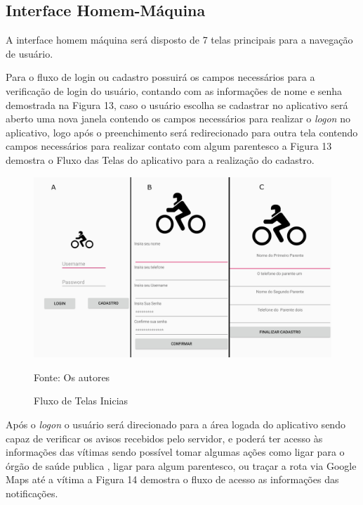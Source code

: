 \subsection{\textbf{Interface Homem-Máquina}}


A interface homem máquina será disposto de 7 telas principais para a navegação de usuário.

Para o fluxo de login ou cadastro possuirá os campos necessários para a verificação de login do usuário, contando com as informações de nome e senha demostrada na Figura 13, caso o usuário escolha se cadastrar no aplicativo será aberto uma nova janela contendo os campos necessários para realizar o \textit{logon} no aplicativo, logo após o preenchimento será redirecionado para outra tela contendo campos necessários para realizar contato com algum parentesco a Figura 13 demostra o Fluxo das Telas do aplicativo para a realização do cadastro.




\begin{figure}[H]

 \caption{Fluxo de Telas Inicias}
\begin{center}
  \includegraphics[width=150mm]{images/Cap3/Sequencia-Login.png}
    \end{center}
      Fonte: Os autores
\end{figure}

   

Após o \textit{logon} o usuário será direcionado para a área logada do aplicativo sendo capaz de verificar os avisos recebidos pelo servidor, e poderá ter acesso às informações das vítimas sendo possível tomar algumas ações como ligar para o órgão de saúde publica , ligar para algum parentesco, ou traçar a rota via Google Maps até a vítima a Figura 14 demostra o fluxo de acesso as informações das notificações.

